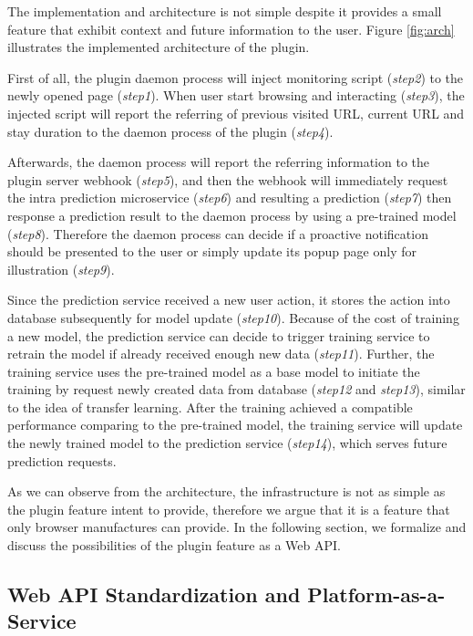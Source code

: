 The implementation and architecture is not simple
despite it provides a small feature that exhibit context and future information to the user.
Figure \ref{fig:arch} illustrates the implemented architecture of the plugin.

First of all, the plugin daemon process will inject monitoring script (\emph{step2}) to 
the newly opened page (\emph{step1}).
When user start browsing and interacting (\emph{step3}), the injected script will report the referring of
previous visited URL, current URL and stay duration to the daemon process of the plugin (\emph{step4}).

Afterwards, the daemon process will report the referring information to the plugin server webhook (\emph{step5}),
and then the webhook will immediately request the intra prediction microservice (\emph{step6}) and resulting a 
prediction (\emph{step7}) then response a prediction result to the daemon process 
by using a pre-trained model (\emph{step8}). Therefore the daemon process can decide 
if a proactive notification should be presented to the user or simply update its popup page
only for illustration (\emph{step9}).

Since the prediction service received a new user action, it stores the action into database
subsequently for model update (\emph{step10}). Because of the cost of training a new model,
the prediction service can decide to trigger training service to retrain the model 
if already received enough new data (\emph{step11}). 
Further, the training service uses the pre-trained model as
a base model to initiate the training by request newly created data from database (\emph{step12} and \emph{step13}), 
similar to the idea of transfer learning.
After the training achieved a compatible performance comparing to the pre-trained model,
the training service will update the newly trained model to the prediction service (\emph{step14}), which 
serves future prediction requests.

As we can observe from the architecture, the infrastructure is not as simple as 
the plugin feature intent to provide, therefore we argue that it is a feature that 
only browser manufactures can provide. In the following section, we formalize and discuss 
the possibilities of the plugin feature as a Web API.

\subsection{Web API Standardization and Platform-as-a-Service}

